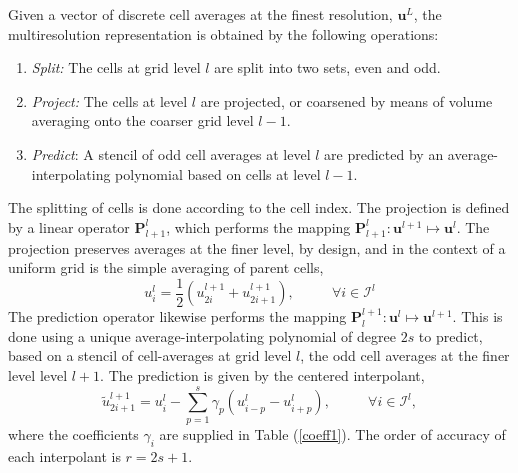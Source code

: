 \documentclass[12pt,letterpaper]{article}
\begin{document}
        Given a vector of discrete cell averages at the finest resolution,
        $\bm{u}^{L}$, the multiresolution representation is obtained by the
        following operations:
        \begin{enumerate}
            \item[] \textit{Split:} The cells at grid level $l$ are split into two
                sets, even and odd.
            \item[] \textit{Project:} The cells at level $l$ are projected, or
                coarsened by means of volume averaging onto the coarser grid level
                $l-1$.
            \item[] \textit{Predict}: A stencil of odd cell averages at level $l$ are predicted
                    by an average-interpolating polynomial based on cells at level
                    $l-1$.
        \end{enumerate}
        The splitting of cells is done according to the cell index. The projection
        is defined by a linear operator $\bm{P}_{l+1}^{l}$, which performs the
        mapping $\bm{P}_{l+1}^{l} : \bm{u}^{l+1} \mapsto \bm{u}^{l}$. The
        projection preserves averages at the finer level, by design, and in the
        context of a uniform grid is the simple averaging of parent cells,
        \begin{equation}
            u^{l}_{i} = \frac{1}{2} ( u^{l+1}_{2i} + u^{l+1}_{2i+1} ), \text{ } \text{ } \text{ } \text{ } \forall i \in \mathcal{I}^{l}
        \end{equation}
        The prediction operator likewise performs the mapping
        $\bm{P}_{l}^{l+1} : \bm{u}^{l} \mapsto \bm{u}^{l+1}$. This is done
        using a unique average-interpolating polynomial of degree $2s$ to
        predict, based on a stencil of cell-averages at grid level $l$, the odd
        cell averages at the finer level level $l+1$. The prediction is given
        by the centered interpolant,
        \begin{equation}
            \tilde{u}_{2i+1}^{l+1} = u_{i}^{l} - \sum_{p=1}^{s}
            \gamma_{p} \left( u^{l}_{i-p} - u^{l}_{i+p} \right), \text{ } \text{ } \text{ } \text{ } \forall i \in \mathcal{I}^{l},
        \end{equation}
        where the coefficients $\gamma_{i}$ are supplied in Table
        (\ref{coeff1}). The order of accuracy of each interpolant is $r=2s+1$.
\end{document}
